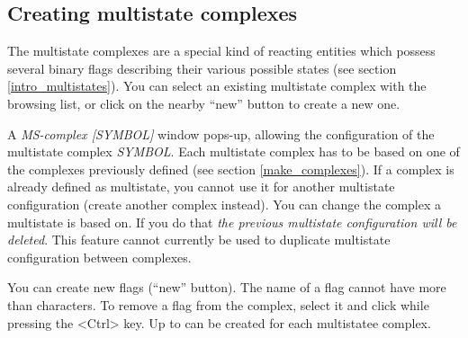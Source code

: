 \newpage

\subsection{Creating multistate complexes}\label{make_multistates}

The multistate complexes are a special kind of reacting entities which possess
several binary flags describing their various possible states (see section
\ref{intro_multistates}).  You can select an existing multistate complex with
the browsing list, or click on the nearby ``new'' button to create a new one.

 A \emph{MS-complex
  [SYMBOL]} window pops-up, allowing the configuration of the multistate complex
\emph{SYMBOL}.  Each multistate complex has to be based on one of the complexes
previously defined (see section \ref{make_complexes}). If a complex is already
defined as multistate, you cannot use it for another multistate configuration
(create another complex instead). You can change the complex a multistate is
based on. If you do that \emph{the previous multistate configuration will be
  deleted}. This feature cannot currently be used to duplicate multistate
configuration between complexes.

You can create new flags (``new'' button). The name of a flag cannot have more than
\MAXMSFLAGLENGTH{} characters. To remove a flag from the complex, select it
and click while pressing the <Ctrl> key. Up to \MAXMSNUMFLAGS{} can be created
for each multistatee  complex.

